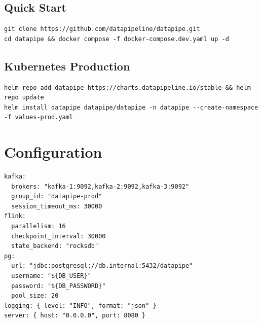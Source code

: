 \documentclass[
    language=english,
    doctype=article,
    institution=none,
]{../../omnilatex}
\begin{document}
\subsection{Quick Start}

\begin{verbatim}
git clone https://github.com/datapipeline/datapipe.git
cd datapipe && docker compose -f docker-compose.dev.yaml up -d
\end{verbatim}

\subsection{Kubernetes Production}

\begin{verbatim}
helm repo add datapipe https://charts.datapipeline.io/stable && helm repo update
helm install datapipe datapipe/datapipe -n datapipe --create-namespace -f values-prod.yaml
\end{verbatim}

\section{Configuration}
\label{sec:configuration}

\begin{verbatim}
kafka:
  brokers: "kafka-1:9092,kafka-2:9092,kafka-3:9092"
  group_id: "datapipe-prod"
  session_timeout_ms: 30000
flink:
  parallelism: 16
  checkpoint_interval: 30000
  state_backend: "rocksdb"
pg:
  url: "jdbc:postgresql://db.internal:5432/datapipe"
  username: "${DB_USER}"
  password: "${DB_PASSWORD}"
  pool_size: 20
logging: { level: "INFO", format: "json" }
server: { host: "0.0.0.0", port: 8080 }
\end{verbatim}
\end{document}

